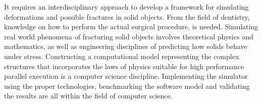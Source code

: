 It requires an interdisciplinary approach to develop a framework for
simulating deformations and possible fractures in solid objects. 
From the field of dentistry, knowledge on how to perform the actual surgical
procedure, is needed. 
%
Simulating real world phenomena of
fracturing solid objects involves theoretical physics and mathematics, as well as
engineering disciplines of predicting how solids behave under
stress. 
%
Constructing a computational model representing the complex structures
that incorporates the laws of physics suitable for high performance
parallel execution is a computer science discipline. Implementing the
simulator using the proper technologies, benchmarking the
software model and validating the results are all within the
field of computer science. 


